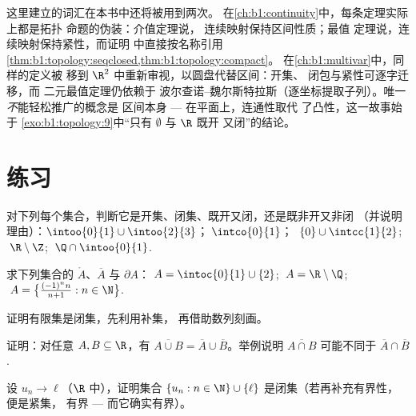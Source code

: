 \begin{remark}[本分册中的视角]
这里建立的词汇在本书中还将被用到两次。
在\cref{ch:b1:continuity}中，每条定理实际上都是拓扑
命题的伪装：介值定理说，
连续映射保持区间性质；最值
定理说，连续映射保持紧性，而证明
中直接按名称引用\cref{thm:b1:topology:seqclosed,thm:b1:topology:compact}。
在\cref{ch:b1:multivar}中，同样的定义被
移到 $\R^2$ 中重新审视，以圆盘代替区间：开集、
闭包与紧性可逐字迁移，而
二元最值定理仍依赖于
波尔查诺--魏尔斯特拉斯（逐坐标提取子列）。唯一
\emph{不}能轻松推广的概念是
区间本身 --- 在平面上，连通性取代
了凸性，这一故事始于
\cref{exo:b1:topology:9}中“只有 $\emptyset$ 与 $\R$ 既开
又闭”的结论。
\end{remark}

\section{练习}

\begin{exercise}[$\star$]\label{exo:b1:topology:1}
对下列每个集合，判断它是开集、闭集、既开又闭，还是既非开又非闭
（并说明理由）：$\intoo{0}{1} \cup \intoo{2}{3}$；$\;\intco{0}{1}$；
$\;\{0\} \cup \intcc{1}{2}$; $\;\R \setminus \Z$; $\;\Q \cap
\intoo{0}{1}$.
\end{exercise}

\begin{exercise}[$\star$]\label{exo:b1:topology:2}
求下列集合的 $\mathring A$、$\overline A$ 与 $\partial A$：
$A = \intoc{0}{1} \cup \{2\}$; $\;A = \R \setminus \Q$;
$\;A = \bigl\{\frac{(-1)^n n}{n+1} : n \in \N\bigr\}$.
\end{exercise}

\begin{exercise}[$\star$]\label{exo:b1:topology:3}
证明有限集是闭集，先利用补集，
再借助数列刻画。
\end{exercise}

\begin{exercise}[$\star$]\label{exo:b1:topology:4}
证明：对任意 $A, B \subseteq \R$，有 $\overline{A \cup B} =
\overline A \cup \overline B$。举例说明
$\overline{A \cap B}$ 可能不同于 $\overline A \cap \overline
B$.
\end{exercise}

\begin{exercise}[$\star\star$]\label{exo:b1:topology:5}
设 $u_n \to \ell$（$\R$ 中），证明集合 $\{u_n : n \in \N\}
\cup \{\ell\}$ 是闭集（若再补充有界性，便是紧集，
  有界 --- 而它确实有界）。
\end{exercise}

